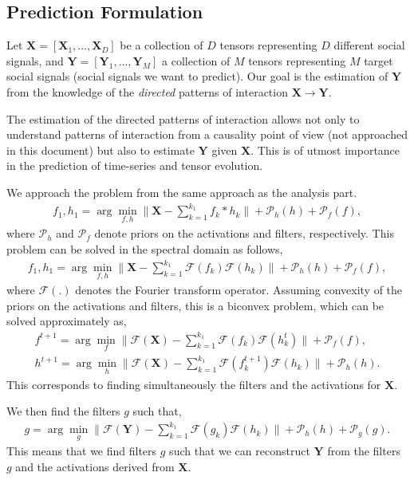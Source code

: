 \documentclass[12pt, a4paper, twoside,draft]{article}
\begin{document}
\subsection{Prediction Formulation}
Let $\mathbf{X} = [\mathbf{X}_1, \hdots, \mathbf{X}_D ]$ be a collection of $D$ tensors representing $D$ different social signals, and
$\mathbf{Y} = [\mathbf{Y}_1, \hdots, \mathbf{Y}_M]$ a collection of $M$ tensors representing $M$ target social signals (social signals we want to predict).
Our goal is the estimation of $\mathbf{Y}$ from the knowledge of the \emph{directed} patterns of interaction $\mathbf{X} \rightarrow \mathbf{Y}$.

The  estimation of the directed patterns of interaction allows not only to understand patterns of interaction from a causality point of view (not approached in this document) but also to estimate $\mathbf{Y}$ given $\mathbf{X}$.
This is of utmost importance in the prediction of time-series and tensor evolution.

We approach the problem from the same approach as the analysis part.
\begin{align}
f_1,h_1 = \arg\min_{f,h} \| \mathbf{X} - \sum_{k=1}^{k_1} f_k \ast h_k \| + \mathcal{P}_h(h) + \mathcal{P}_f(f),
\end{align}
where $\mathcal{P}_h$ and  $\mathcal{P}_f$ denote priors on the activations and filters, respectively.
This problem can be solved in the spectral domain as follows,
\begin{align}
f_1,h_1 = \arg\min_{f,h} \| \mathbf{X} -  \sum_{k=1}^{k_1}  \mathcal{F}(f_k)  \mathcal{F}(  h_k) \| + \mathcal{P}_h(h) + \mathcal{P}_f (f),
\end{align}
where $\mathcal{F}(.)$ denotes the Fourier transform operator.
Assuming convexity of the priors on the activations and filters, this is a biconvex problem, which can be solved approximately as,
\begin{align}
  f^{t+1} = \arg\min_{f} \|  \mathcal{F}(\mathbf{X}) - \sum_{k=1}^{k_1}  \mathcal{F}(f_k)  \mathcal{F}(  h^{t}_k) \| + \mathcal{P}_f (f), \\
 h^{t+1} = \arg\min_{h} \|  \mathcal{F}(\mathbf{X}) - \sum_{k=1}^{k_1}  \mathcal{F}(f^{t+1}_k) \mathcal{F}(  h_k) \| +  \mathcal{P}_h (h).
\end{align}
This corresponds to finding simultaneously the filters and the activations for $\mathbf{X}$.

We then find the filters $g$ such that,
\begin{align}
g = \arg\min_{g} \|  \mathcal{F}(\mathbf{Y}) - \sum_{k=1}^{k_1}  \mathcal{F}(g_k) \mathcal{F}(  h_k) \| + \mathcal{P}_h(h) + \mathcal{P}_g(g).
\end{align}
This means that we find filters $g$ such that we can reconstruct $\mathbf{Y}$ from the filters $g$ and the activations derived from $\mathbf{X}$.
\end{document}
